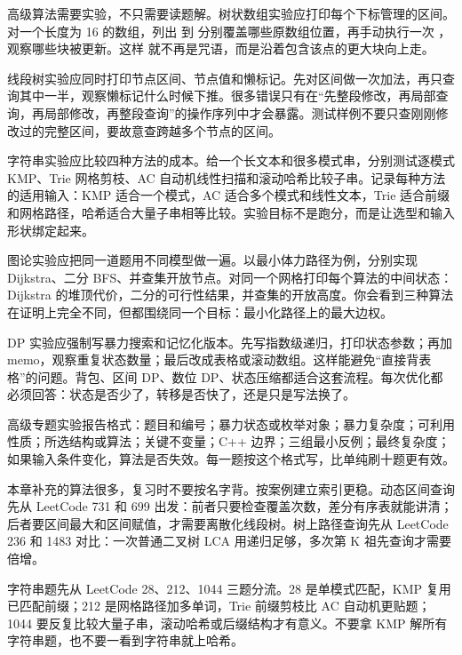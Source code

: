 
高级算法需要实验，不只需要读题解。树状数组实验应打印每个下标管理的区间。对一个长度为 16 的数组，列出  到  分别覆盖哪些原数组位置，再手动执行一次 ，观察哪些块被更新。这样  就不再是咒语，而是沿着包含该点的更大块向上走。

线段树实验应同时打印节点区间、节点值和懒标记。先对区间做一次加法，再只查询其中一半，观察懒标记什么时候下推。很多错误只有在“先整段修改，再局部查询，再局部修改，再整段查询”的操作序列中才会暴露。测试样例不要只查刚刚修改过的完整区间，要故意查跨越多个节点的区间。

字符串实验应比较四种方法的成本。给一个长文本和很多模式串，分别测试逐模式 KMP、Trie 网格剪枝、AC 自动机线性扫描和滚动哈希比较子串。记录每种方法的适用输入：KMP 适合一个模式，AC 适合多个模式和线性文本，Trie 适合前缀和网格路径，哈希适合大量子串相等比较。实验目标不是跑分，而是让选型和输入形状绑定起来。

图论实验应把同一道题用不同模型做一遍。以最小体力路径为例，分别实现 Dijkstra、二分 BFS、并查集开放节点。对同一个网格打印每个算法的中间状态：Dijkstra 的堆顶代价，二分的可行性结果，并查集的开放高度。你会看到三种算法在证明上完全不同，但都围绕同一个目标：最小化路径上的最大边权。

DP 实验应强制写暴力搜索和记忆化版本。先写指数级递归，打印状态参数；再加 memo，观察重复状态数量；最后改成表格或滚动数组。这样能避免“直接背表格”的问题。背包、区间 DP、数位 DP、状态压缩都适合这套流程。每次优化都必须回答：状态是否少了，转移是否快了，还是只是写法换了。

\begin{labbox}
高级专题实验报告格式：题目和编号；暴力状态或枚举对象；暴力复杂度；可利用性质；所选结构或算法；关键不变量；C++ 边界；三组最小反例；最终复杂度；如果输入条件变化，算法是否失效。每一题按这个格式写，比单纯刷十题更有效。
\end{labbox}


本章补充的算法很多，复习时不要按名字背。按案例建立索引更稳。动态区间查询先从 LeetCode 731 和 699 出发：前者只要检查覆盖次数，差分有序表就能讲清；后者要区间最大和区间赋值，才需要离散化线段树。树上路径查询先从 LeetCode 236 和 1483 对比：一次普通二叉树 LCA 用递归足够，多次第 K 祖先查询才需要倍增。

字符串题先从 LeetCode 28、212、1044 三题分流。28 是单模式匹配，KMP 复用已匹配前缀；212 是网格路径加多单词，Trie 前缀剪枝比 AC 自动机更贴题；1044 要反复比较大量子串，滚动哈希或后缀结构才有意义。不要拿 KMP 解所有字符串题，也不要一看到字符串就上哈希。

